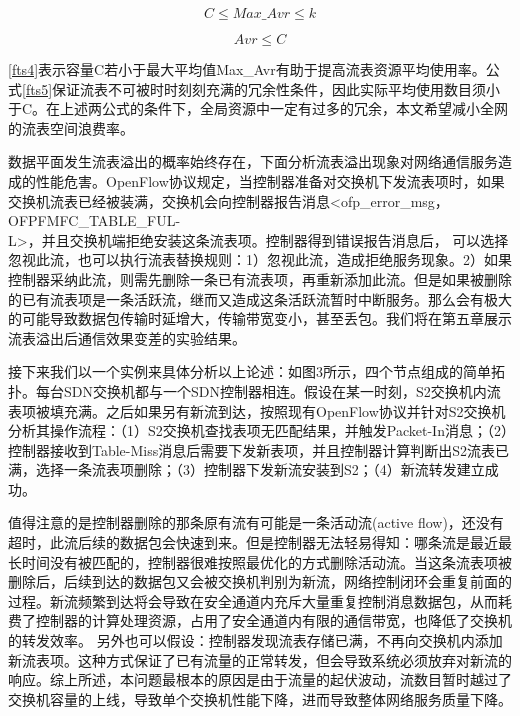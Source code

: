 \begin{equation}\label{fts4}
C \leq Max\_Avr \leq k 
\end{equation}

\begin{equation}\label{fts5}
Avr \leq C 
\end{equation}

\ref{fts4}表示容量C若小于最大平均值Max\_Avr有助于提高流表资源平均使用率。公式\ref{fts5}保证流表不可被时时刻刻充满的冗余性条件，因此实际平均使用数目须小于C。在上述两公式的条件下，全局资源中一定有过多的冗余，本文希望减小全网的流表空间浪费率。




数据平面发生流表溢出的概率始终存在，下面分析流表溢出现象对网络通信服务造成的性能危害。OpenFlow协议规定，当控制器准备对交换机下发流表项时，如果交换机流表已经被装满，交换机会向控制器报告消息<ofp\_error\_msg，OFPFMFC\_TABLE\_FUL-\\
L>，并且交换机端拒绝安装这条流表项。控制器得到错误报告消息后， 可以选择忽视此流，也可以执行流表替换规则：1）忽视此流，造成拒绝服务现象。2）如果控制器采纳此流，则需先删除一条已有流表项，再重新添加此流。但是如果被删除的已有流表项是一条活跃流，继而又造成这条活跃流暂时中断服务。那么会有极大的可能导致数据包传输时延增大，传输带宽变小，甚至丢包。我们将在第五章展示流表溢出后通信效果变差的实验结果。

接下来我们以一个实例来具体分析以上论述：如图3所示，四个节点组成的简单拓扑。每台SDN交换机都与一个SDN控制器相连。假设在某一时刻，S2交换机内流表项被填充满。之后如果另有新流到达，按照现有OpenFlow协议并针对S2交换机分析其操作流程：（1）S2交换机查找表项无匹配结果，并触发Packet-In消息；（2）控制器接收到Table-Miss消息后需要下发新表项，并且控制器计算判断出S2流表已满，选择一条流表项删除；（3）控制器下发新流安装到S2；（4）新流转发建立成功。

值得注意的是控制器删除的那条原有流有可能是一条活动流(active flow)，还没有超时，此流后续的数据包会快速到来。但是控制器无法轻易得知：哪条流是最近最长时间没有被匹配的，控制器很难按照最优化的方式删除活动流。当这条流表项被删除后，后续到达的数据包又会被交换机判别为新流，网络控制闭环会重复前面的过程。新流频繁到达将会导致在安全通道内充斥大量重复控制消息数据包，从而耗费了控制器的计算处理资源，占用了安全通道内有限的通信带宽，也降低了交换机的转发效率。
另外也可以假设：控制器发现流表存储已满，不再向交换机内添加新流表项。这种方式保证了已有流量的正常转发，但会导致系统必须放弃对新流的响应。综上所述，本问题最根本的原因是由于流量的起伏波动，流数目暂时越过了交换机容量的上线，导致单个交换机性能下降，进而导致整体网络服务质量下降。


